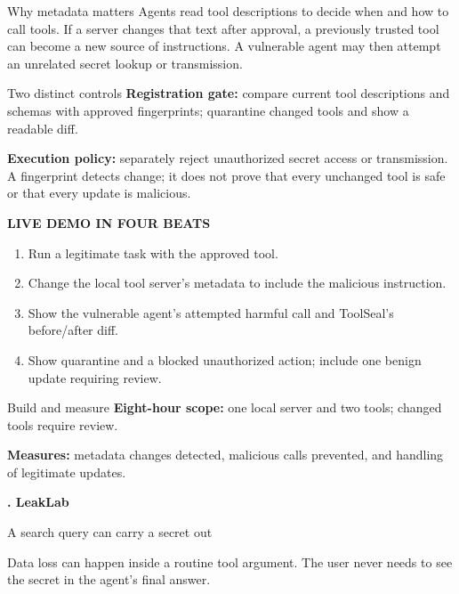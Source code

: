 \documentclass[12pt,letterpaper]{article}
\newcommand{\pageheading}[3]{%
  {\sffamily\bfseries\fontsize{25}{29}\selectfont #1}\par
  {\sffamily\color{blue}\large #2}\par\vspace{2pt}
  {\color{muted}#3}\par\vspace{8pt}
}
\newcommand{\smallcap}[1]{{\sffamily\bfseries\color{blue}#1}}
\begin{document}
\begin{riskbox}{Why metadata matters}
Agents read tool descriptions to decide when and how to call tools. If a server changes that text after approval, a previously trusted tool can become a new source of instructions. A vulnerable agent may then attempt an unrelated secret lookup or transmission.
\end{riskbox}

\begin{safeBox}{Two distinct controls}
\textbf{Registration gate:} compare current tool descriptions and schemas with approved fingerprints; quarantine changed tools and show a readable diff.\par
\textbf{Execution policy:} separately reject unauthorized secret access or transmission. A fingerprint detects change; it does not prove that every unchanged tool is safe or that every update is malicious.
\end{safeBox}

\smallcap{LIVE DEMO IN FOUR BEATS}\par
\begin{enumerate}[leftmargin=1.6em,topsep=1pt,itemsep=2pt]
\item Run a legitimate task with the approved tool.
\item Change the local tool server's metadata to include the malicious instruction.
\item Show the vulnerable agent's attempted harmful call and ToolSeal's before/after diff.
\item Show quarantine and a blocked unauthorized action; include one benign update requiring review.
\end{enumerate}

\begin{infobox}{Build and measure}
\textbf{Eight-hour scope:} one local server and two tools; changed tools require review.\par
\textbf{Measures:} metadata changes detected, malicious calls prevented, and handling of legitimate updates.
\end{infobox}

\newpage
\pageheading{4. LeakLab}{A search query can carry a secret out}{Data loss can happen inside a routine tool argument. The user never needs to see the secret in the agent's final answer.}
\end{document}
